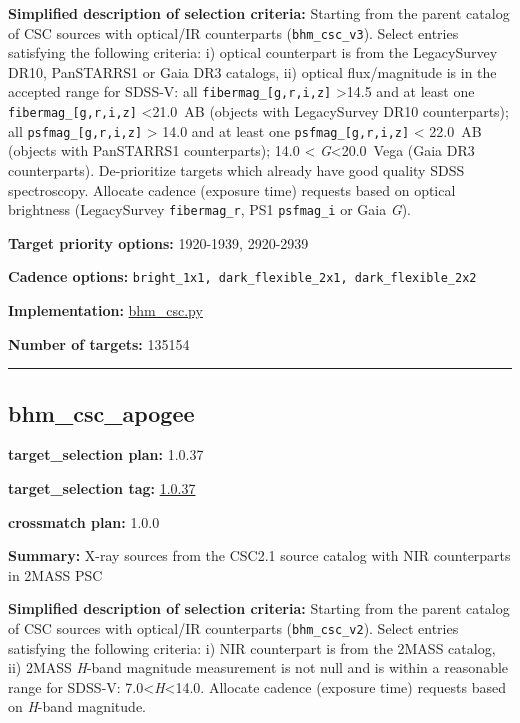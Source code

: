 \noindent\textbf{Simplified description of selection criteria:} Starting from the
parent catalog of CSC sources with optical/IR counterparts
(\texttt{bhm\_csc\_v3}). Select entries satisfying the following
criteria: i) optical counterpart is from the LegacySurvey DR10,
PanSTARRS1 or Gaia DR3 catalogs, ii) optical flux/magnitude is in the
accepted range for SDSS-V: all \texttt{fibermag\_{[}g,r,i,z{]}}
\textgreater14.5 and at least one \texttt{fibermag\_{[}g,r,i,z{]}}
\textless21.0~AB (objects with LegacySurvey DR10 counterparts); all
\texttt{psfmag\_{[}g,r,i,z{]}} \textgreater{} 14.0 and at least one
\texttt{psfmag\_{[}g,r,i,z{]}} \textless{} 22.0~AB (objects with
PanSTARRS1 counterparts); 14.0 \textless{} \emph{G}\textless20.0~Vega
(Gaia DR3 counterparts). De-prioritize targets which already have good
quality SDSS spectroscopy. Allocate cadence (exposure time) requests
based on optical brightness (LegacySurvey \texttt{fibermag\_r}, PS1
\texttt{psfmag\_i} or Gaia \emph{G}).


\noindent\textbf{Target priority options:} 1920-1939, 2920-2939

\noindent\textbf{Cadence options:}
\texttt{bright\_1x1,\ dark\_flexible\_2x1,\ dark\_flexible\_2x2}

\noindent\textbf{Implementation:}
\href{https://github.com/sdss/target_selection/blob/1.0.37/python/target_selection/cartons/bhm_csc.py}{bhm\_csc.py}

\noindent\textbf{Number of targets:} 135154

\begin{center}\rule{0.5\linewidth}{0.5pt}\end{center}

\hypertarget{bhm_csc_apogee_plan1.0.37}{%
\subsection{bhm\_csc\_apogee}\label{bhm_csc_apogee_plan1.0.37}}

\noindent\textbf{target\_selection plan:} 1.0.37

\noindent\textbf{target\_selection tag:}
\href{https://github.com/sdss/target_selection/tree/1.0.37/}{1.0.37}

\noindent\textbf{crossmatch plan:} 1.0.0

\noindent\textbf{Summary:} X-ray sources from the CSC2.1 source catalog with NIR
counterparts in 2MASS PSC

\noindent\textbf{Simplified description of selection criteria:} Starting from the
parent catalog of CSC sources with optical/IR counterparts
(\texttt{bhm\_csc\_v2}). Select entries satisfying the following
criteria: i) NIR counterpart is from the 2MASS catalog, ii) 2MASS
\emph{H}-band magnitude measurement is not null and is within a
reasonable range for SDSS-V: 7.0\textless{}\emph{H}\textless14.0.
Allocate cadence (exposure time) requests based on \emph{H}-band
magnitude.


